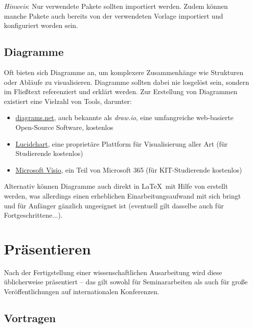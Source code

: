 \noindent
\emph{Hinweis}: Nur verwendete Pakete sollten importiert werden. 
Zudem können manche Pakete auch bereits von der verwendeten Vorlage importiert und konfiguriert worden sein.

\subsection{Diagramme}
\label{sec:Schreiben:Diagramme}

Oft bieten sich Diagramme an, um komplexere Zusammenhänge wie Strukturen oder Abläufe zu visualisieren. Diagramme sollten dabei nie losgelöst sein, sondern im Fließtext referenziert und erklärt werden. Zur Erstellung von Diagrammen existiert eine Vielzahl von Tools, darunter:

\smallskip
\begin{itemize}[label={\symbolTool}]
    \item \href{https://www.diagrams.net//}{diagrams.net}, auch bekannte als \emph{draw.io}, eine umfangreiche web-basierte Open-Source Software, kostenlos
    \item \href{https://www.lucidchart.com/}{Lucidchart}, eine proprietäre Plattform für Visualisierung aller Art (für Studierende kostenlos)
    \item \href{https://www.microsoft.com/de-de/microsoft-365/visio}{Microsoft Visio}, ein Teil von Microsoft 365 (für KIT-Studierende kostenlos)
\end{itemize}
\smallskip

\noindent
Alternativ können Diagramme auch direkt in \LaTeX\ mit Hilfe von  erstellt werden, was allerdings einen erheblichen Einarbeitungsaufwand mit sich bringt und für Anfänger gänzlich ungeeignet ist (eventuell gilt dasselbe auch für Fortgeschrittene...).

\section{Präsentieren}
\label{sec:Praesentieren}

Nach der Fertigstellung einer wissenschaftlichen Ausarbeitung wird diese üblicherweise präsentiert -- das gilt sowohl für Seminararbeiten als auch für große Veröffentlichungen auf internationalen Konferenzen. 

\subsection{Vortragen}
\label{sec:Praesentieren:Vortragen}

